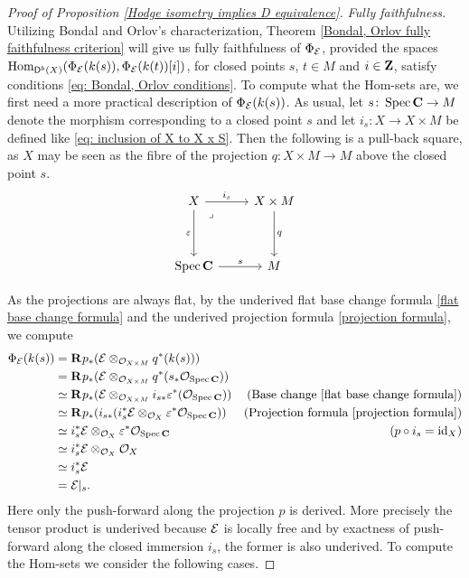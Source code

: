 \begin{proof}[Proof of Proposition \ref{Hodge isometry implies D equivalence}]
    \noindent
    \textsl{Fully faithfulness.} Utilizing Bondal and Orlov's characterization, Theorem \ref{Bondal, Orlov fully faithfulness criterion} will give us fully faithfulness of $\Phi_{\mathcal E}$, provided the spaces $\mathrm{Hom}_{\mathsf{D}^b(X)}(\Phi_{\mathcal E}(k(s)), \Phi_{\mathcal E}(k(t))[i])$, for closed points $s$, $t \in M$ and $i \in \mathbf Z$, satisfy conditions \eqref{eq: Bondal, Orlov conditions}. To compute what the Hom-sets are, we first need a more practical description of $\Phi_{\mathcal E}(k(s))$. As usual, let $s \colon \operatorname{Spec}\mathbf C \to M$ denote the morphism corresponding to a closed point $s$ and let $i_s \colon X \to X \times M$ be defined like \eqref{eq: inclusion of X to X x S}. Then the following is a pull-back square, as $X$ may be seen as the fibre of the projection $q \colon X \times M \to M$ above the closed point $s$.
    \[\begin{tikzcd}[column sep = small, row sep = 1.8em]
        X && X \times M \\
        \\
        \spec{\C} && M
        \arrow["{i_s}", from=1-1, to=1-3]
        \arrow["{\varepsilon}"', from=1-1, to=3-1]
        \arrow["\lrcorner"{anchor=center, pos=0.125}, draw=none, from=1-1, to=3-3]
        \arrow["{q}", from=1-3, to=3-3]
        \arrow["{s}", from=3-1, to=3-3]
    \end{tikzcd}\]

    As the projections are always flat, by the underived flat base change formula \ref{flat base change formula} and the underived projection formula \ref{projection formula}, we compute
    \begin{align*}
        \Phi_{\mathcal E}(k(s)) 
        &= \mathbf{R}^{}p_*(\mathcal E \otimes_{{\mathcal{O}_{X \times M}}} q^*(k(s))) \\
        & = \mathbf{R}^{}p_*(\mathcal E \otimes_{{\mathcal{O}_{X \times M}}} q^*(s_*{\mathcal{O}_{\operatorname{Spec}\mathbf C}})) \\
        & \simeq \mathbf{R}^{}p_*(\mathcal E \otimes_{{\mathcal{O}_{X \times M}}} i_{s*}\varepsilon^*({\mathcal{O}_{\operatorname{Spec}\mathbf C}})) &\text{(Base change \ref{flat base change formula})}\\
        & \simeq \mathbf{R}^{}p_*(i_{s*}(i_s^*\mathcal E \otimes_{{\mathcal{O}_{X}}} \varepsilon^*{\mathcal{O}_{\operatorname{Spec}\mathbf C}})) &\text{(Projection formula \ref{projection formula})}\\
        & \simeq i_s^*\mathcal E \otimes_{{\mathcal{O}_{X}}} \varepsilon^*{\mathcal{O}_{\operatorname{Spec}\mathbf C}} &\text{($p \circ i_s = \operatorname{id}_{X}$)}\\
        & \simeq i_s^*\mathcal E \otimes_{{\mathcal{O}_{X}}} {\mathcal{O}_{X}} \\
        & \simeq i_s^*\mathcal E \\
        & = \mathcal E|_s.
    \end{align*}
    Here only the push-forward along the projection $p$ is derived. More precisely the tensor product is underived because $\mathcal E$ is locally free and by exactness of push-forward along the closed immersion $i_s$, the former is also underived. To compute the Hom-sets we consider the following cases.


\end{proof}
